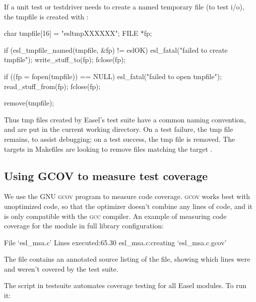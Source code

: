 If a unit test or testdriver needs to create a named temporary file
(to test i/o), the tmpfile is created with
:

\begin{cchunk}
   char  tmpfile[16] = "esltmpXXXXXX";
   FILE *fp;

   if (esl_tmpfile_named(tmpfile, &fp) != eslOK) esl_fatal("failed to create tmpfile");
   write_stuff_to(fp);
   fclose(fp);

   if ((fp = fopen(tmpfile)) == NULL) esl_fatal("failed to open tmpfile");
   read_stuff_from(fp);
   fclose(fp);

   remove(tmpfile);
\end{cchunk}

Thus tmp files created by Easel's test suite have a common naming
convention, and are put in the current working directory. On a test
failure, the tmp file remains, to assist debugging; on a test success,
the tmp file is removed. The  targets in Makefiles
are looking to remove files matching the target .

\subsection{Using GCOV to measure test coverage} 

We use the GNU \textsc{gcov} program to measure code
coverage. \textsc{gcov} works best with unoptimized code, so that the
optimizer doesn't combine any lines of code, and it is only compatible
with the \textsc{gcc} compiler. An example of measuring code coverage
for the  module in full library configuration:

\begin{cchunk}
  File `esl_msa.c'
  Lines executed:65.30%
  esl_msa.c:creating `esl_msa.c.gcov'
\end{cchunk}

The file  contains an annotated source listing
of the  file, showing which lines were and weren't covered
by the test suite.

The  script in testsuite automates coverage
testing for all Easel modules. To run it:

\begin{cchunk} 
\end{cchunk}



